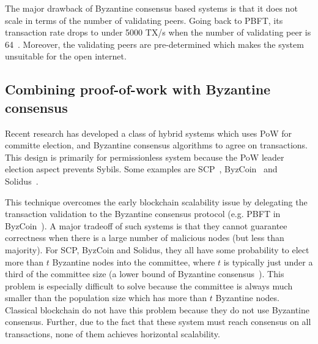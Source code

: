The major drawback of Byzantine consensus based systems is that it does not scale in terms of the number of validating peers.
Going back to PBFT, its transaction rate drops to under 5000 TX/s when the number of validating peer is 64~\cite[Section 5.2]{miller2016honey}.
Moreover, the validating peers are pre-determined which makes the system unsuitable for the open internet.



\subsection{Combining proof-of-work with Byzantine consensus}
Recent research has developed a class of hybrid systems which uses PoW for committe election,
and Byzantine consensus algorithms to agree on transactions.
This design is primarily for permissionless system because the PoW leader election aspect prevents Sybils.
Some examples are SCP~\cite{luu2015scp}, ByzCoin~\cite{kogias2016enhancing} and Solidus~\cite{abraham2016solidus}.

This technique overcomes the early blockchain scalability issue by delegating the transaction validation to the Byzantine consensus protocol (e.g. PBFT in ByzCoin~\cite{kogias2016enhancing}).
A major tradeoff of such systems is that they cannot guarantee correctness when there is a large number of malicious nodes (but less than majority).
For SCP, ByzCoin and Solidus, they all have some probability to elect more than $t$ Byzantine nodes into the committee,
where $t$ is typically just under a third of the committee size (a lower bound of Byzantine consensus~\cite{pease1980reaching}).
This problem is especially difficult to solve because the committee is always much smaller than the population size which has more than $t$ Byzantine nodes.
Classical blockchain do not have this problem because they do not use Byzantine consensus.
Further, due to the fact that these system must reach consensus on all transactions, none of them achieves horizontal scalability.

